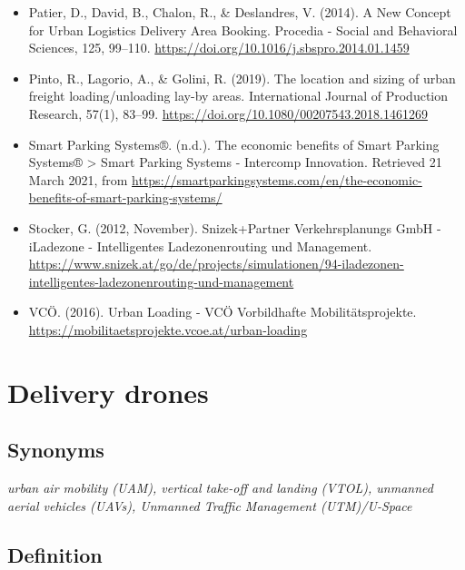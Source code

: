\documentclass[
]{book}
\begin{document}
\begin{itemize}
\item
  Patier, D., David, B., Chalon, R., \& Deslandres, V. (2014). A New Concept for Urban Logistics Delivery Area Booking. Procedia - Social and Behavioral Sciences, 125, 99--110. \url{https://doi.org/10.1016/j.sbspro.2014.01.1459}
\item
  Pinto, R., Lagorio, A., \& Golini, R. (2019). The location and sizing of urban freight loading/unloading lay-by areas. International Journal of Production Research, 57(1), 83--99. \url{https://doi.org/10.1080/00207543.2018.1461269}
\item
  Smart Parking Systems®. (n.d.). The economic benefits of Smart Parking Systems® \textgreater{} Smart Parking Systems - Intercomp Innovation. Retrieved 21 March 2021, from \url{https://smartparkingsystems.com/en/the-economic-benefits-of-smart-parking-systems/}
\item
  Stocker, G. (2012, November). Snizek+Partner Verkehrsplanungs GmbH - iLadezone - Intelligentes Ladezonenrouting und Management. \url{https://www.snizek.at/go/de/projects/simulationen/94-iladezonen-intelligentes-ladezonenrouting-und-management}
\item
  VCÖ. (2016). Urban Loading - VCÖ Vorbildhafte Mobilitätsprojekte. \url{https://mobilitaetsprojekte.vcoe.at/urban-loading}
\end{itemize}

\hypertarget{delivery_drone}{%
\section{Delivery drones}\label{delivery_drone}}

\hypertarget{synonyms-22}{%
\subsection*{Synonyms}\label{synonyms-22}}

\emph{urban air mobility (UAM), vertical take-off and landing (VTOL), unmanned aerial vehicles (UAVs), Unmanned Traffic Management (UTM)/U-Space}

\hypertarget{definition-25}{%
\subsection*{Definition}\label{definition-25}}
\end{document}
